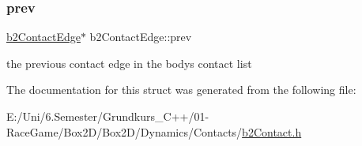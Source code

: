 \subsubsection{\texorpdfstring{prev}{prev}}
{\footnotesize\ttfamily \mbox{\hyperlink{structb2_contact_edge}{b2\+Contact\+Edge}}$\ast$ b2\+Contact\+Edge\+::prev}



the previous contact edge in the body\textquotesingle{}s contact list 



The documentation for this struct was generated from the following file\+:\begin{DoxyCompactItemize}
\item 
E\+:/\+Uni/6.\+Semester/\+Grundkurs\+\_\+\+C++/01-\/\+Race\+Game/\+Box2\+D/\+Box2\+D/\+Dynamics/\+Contacts/\mbox{\hyperlink{b2_contact_8h}{b2\+Contact.\+h}}\end{DoxyCompactItemize}

